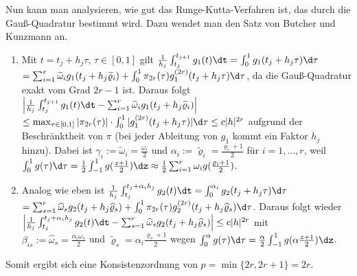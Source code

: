 \begin{Bem}
    Nun kann man analysieren, wie gut das Runge-Kutta-Verfahren ist, das durch
    die Gauß-Quadratur bestimmt wird.
    Dazu wendet man den Satz von Butcher und Kunzmann an.
    \begin{enumerate}[label=(\emph{\roman*})]
        \item
        Mit $t = t_j + h_j \tau$, $\tau \in [0, 1]$ gilt
        $\frac{1}{h_j} \int_{t_j}^{t_{j+1}} g_1(t)\dt =
        \int_0^1 g_1(t_j + h_j \tau)\d\tau$\\
        $=
        \sum_{i=1}^r \widetilde{\omega}_i g_1(t_j + h_j \widetilde{\varrho}_i)
        + \int_0^1 \pi_{2r}(\tau) g_1^{(2r)}(t_j + h_j \tau) \d\tau$,
        da die Gauß-Quadratur exakt vom Grad $2r - 1$ ist.
        Daraus folgt
        $\left|\frac{1}{h_j} \int_{t_j}^{t_{j+1}} g_1(t)\dt -
        \sum_{i=1}^r \widetilde{\omega}_i g_1(t_j + h_j \widetilde{\varrho}_i)
        \right|$\\
        $\le \max_{\tau \in [0, 1]} |\pi_{2r}(\tau)| \cdot
        \int_0^1 |g_1^{(2r)}(t_j + h_j \tau)| \d\tau \le c |h|^{2r}$
        aufgrund der Beschränktheit von $\pi$
        (bei jeder Ableitung von $g_1$ kommt ein Faktor $h_j$ hinzu).
        Dabei ist $\gamma_i := \widetilde{\omega}_i = \frac{\omega_i}{2}$
        und $\alpha_i := \widetilde{\varrho}_i = \frac{\varrho_i + 1}{2}$
        für $i = 1, \dotsc, r$, weil
        $\int_0^1 g(\tau)\d\tau = \frac{1}{2} \int_{-1}^1 g(\frac{z+1}{2})\dz
        \approx \frac{1}{2} \sum_{i=1}^r \omega_i g(\frac{\varrho_i + 1}{2})$.
        
        \item
        Analog wie eben ist
        $\frac{1}{h_j} \int_{t_j}^{t_j + \alpha_i h_j} g_2(t)\dt =
        \int_0^{\alpha_i} g_2(t_j + h_j \tau)\d\tau$\\
        $= \sum_{s=1}^r \widehat{\omega}_s g_2(t_j + h_j \widehat{\varrho}_s) +
        \int_0^1 \pi_{2r}(\tau)
        g_2^{(2r)}(t_j + h_j \widehat{\varrho}_s)\d\tau$. Daraus folgt wieder\\
        $\left|\frac{1}{h_j} \int_{t_j}^{t_j + \alpha_i h_j} g_2(t)\dt -
        \sum_{s=1}^r \widehat{\omega}_s
        g_2(t_j + h_j \widehat{\varrho}_s)\right| \le c |h|^{2r}$ mit\\
        $\beta_{is} := \widehat{\omega}_s = \frac{\alpha_i \omega_s}{2}$
        und $\widetilde{\varrho}_s = \alpha_i \frac{\varrho_s + 1}{2}$ wegen
        $\int_0^\alpha g(\tau)\d\tau =
        \frac{\alpha}{2} \int_{-1}^1 g(\alpha \frac{z + 1}{2})\dz$.
    \end{enumerate}
    Somit ergibt sich eine Konsistenzordnung von $p = \min\{2r, 2r + 1\} = 2r$.
\end{Bem}

